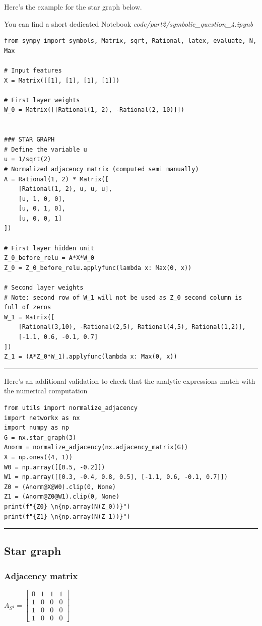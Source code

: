 \documentclass[a4paper]{article}
\begin{document}
Here's the example for the star graph below.

You can find a short dedicated Notebook 
\textit{code/part2/symbolic\_question\_4.ipynb}

\begin{verbatim}
from sympy import symbols, Matrix, sqrt, Rational, latex, evaluate, N, Max

# Input features
X = Matrix([[1], [1], [1], [1]])

# First layer weights
W_0 = Matrix([[Rational(1, 2), -Rational(2, 10)]])


### STAR GRAPH
# Define the variable u
u = 1/sqrt(2)
# Normalized adjacency matrix (computed semi manually)
A = Rational(1, 2) * Matrix([
    [Rational(1, 2), u, u, u],
    [u, 1, 0, 0],
    [u, 0, 1, 0],
    [u, 0, 0, 1]
])

# First layer hidden unit
Z_0_before_relu = A*X*W_0
Z_0 = Z_0_before_relu.applyfunc(lambda x: Max(0, x))

# Second layer weights 
# Note: second row of W_1 will not be used as Z_0 second column is full of zeros
W_1 = Matrix([
    [Rational(3,10), -Rational(2,5), Rational(4,5), Rational(1,2)],
    [-1.1, 0.6, -0.1, 0.7]
])
Z_1 = (A*Z_0*W_1).applyfunc(lambda x: Max(0, x))
\end{verbatim}


\hrule
Here's an additional validation to check that the analytic expressions match with the numerical computation
\begin{verbatim}
from utils import normalize_adjacency
import networkx as nx
import numpy as np
G = nx.star_graph(3)
Anorm = normalize_adjacency(nx.adjacency_matrix(G))
X = np.ones((4, 1))
W0 = np.array([[0.5, -0.2]])
W1 = np.array([[0.3, -0.4, 0.8, 0.5], [-1.1, 0.6, -0.1, 0.7]])
Z0 = (Anorm@X@W0).clip(0, None)
Z1 = (Anorm@Z0@W1).clip(0, None)
print(f"{Z0} \n{np.array(N(Z_0))}")
print(f"{Z1} \n{np.array(N(Z_1))}")
\end{verbatim}
\hrule

\break
\subsection*{Star graph}

\subsubsection*{Adjacency matrix}
$ A_{S^4} = \begin{bmatrix}
    0  &  1  &  1  &  1 \\
    1  &  0  &  0  &  0 \\
    1  &  0  &  0  &  0 \\
    1  &  0  &  0  &  0 
\end{bmatrix}
$
\end{document}
